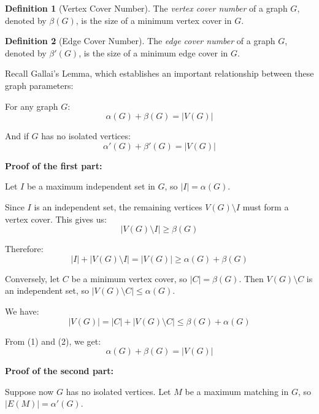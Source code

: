 \documentclass{article}
\theoremstyle{definition}
\newtheorem{definition}{Definition}
\begin{document}
\begin{definition}[Vertex Cover Number]
The \emph{vertex cover number} of a graph $G$, denoted by $\beta(G)$, is the size of a minimum vertex cover in $G$.
\end{definition}

\begin{definition}[Edge Cover Number]
The \emph{edge cover number} of a graph $G$, denoted by $\beta'(G)$, is the size of a minimum edge cover in $G$.
\end{definition}

Recall Gallai's Lemma, which establishes an important relationship between these graph parameters:

For any graph $G$:
\begin{equation}
\alpha(G) + \beta(G) = |V(G)|
\end{equation}

And if $G$ has no isolated vertices:
\begin{equation}
\alpha'(G) + \beta'(G) = |V(G)|
\end{equation}

\textbf{Proof of the first part:}

Let $I$ be a maximum independent set in $G$, so $|I| = \alpha(G)$.

Since $I$ is an independent set, the remaining vertices $V(G) \setminus I$ must form a vertex cover. This gives us:
\begin{equation}
|V(G) \setminus I| \geq \beta(G)
\end{equation}

Therefore:
\begin{equation}
|I| + |V(G) \setminus I| = |V(G)| \geq \alpha(G) + \beta(G) 
\end{equation}

Conversely, let $C$ be a minimum vertex cover, so $|C| = \beta(G)$. Then $V(G) \setminus C$ is an independent set, so $|V(G) \setminus C| \leq \alpha(G)$.

We have:
\begin{equation}
|V(G)| = |C| + |V(G) \setminus C| \leq \beta(G) + \alpha(G) 
\end{equation}

From (1) and (2), we get:
\begin{equation}
\alpha(G) + \beta(G) = |V(G)|
\end{equation}

\textbf{Proof of the second part:}

Suppose now $G$ has no isolated vertices. Let $M$ be a maximum matching in $G$, so $|E(M)| = \alpha'(G)$.
\end{document}
